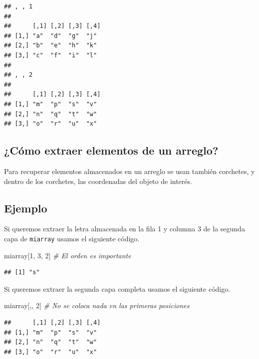 \documentclass[10pt,]{krantz}
\makeatletter
\newenvironment{Shaded}{\begin{snugshade}}{\end{snugshade}}
\newcommand{\DecValTok}[1]{\textcolor[rgb]{0.00,0.00,0.81}{{#1}}}
\newcommand{\CommentTok}[1]{\textcolor[rgb]{0.56,0.35,0.01}{\textit{{#1}}}}
\newcommand{\NormalTok}[1]{{#1}}
\newenvironment{kframe}{%
\medskip{}
\setlength{\fboxsep}{.8em}
 \def\at@end@of@kframe{}%
 \ifinner\ifhmode%
  \def\at@end@of@kframe{\end{minipage}}%
  \begin{minipage}{\columnwidth}%
 \fi\fi%
 \def\FrameCommand##1{\hskip\@totalleftmargin \hskip-\fboxsep
 \colorbox{shadecolor}{##1}\hskip-\fboxsep
     \hskip-\linewidth \hskip-\@totalleftmargin \hskip\columnwidth}%
 \MakeFramed {\advance\hsize-\width
   \@totalleftmargin\z@ \linewidth\hsize
   \@setminipage}}%
 {\par\unskip\endMakeFramed%
 \at@end@of@kframe}
\renewenvironment{Shaded}{\begin{kframe}}{\end{kframe}}
\makeatother
\begin{document}
\begin{verbatim}
## , , 1
## 
##      [,1] [,2] [,3] [,4]
## [1,] "a"  "d"  "g"  "j" 
## [2,] "b"  "e"  "h"  "k" 
## [3,] "c"  "f"  "i"  "l" 
## 
## , , 2
## 
##      [,1] [,2] [,3] [,4]
## [1,] "m"  "p"  "s"  "v" 
## [2,] "n"  "q"  "t"  "w" 
## [3,] "o"  "r"  "u"  "x"
\end{verbatim}

\subsection{¿Cómo extraer elementos de un
arreglo?}\label{como-extraer-elementos-de-un-arreglo}

Para recuperar elementos almacenados en un arreglo se usan también
corchetes, y dentro de los corchetes, las coordenadas del objeto de
interés.

\subsection*{Ejemplo}\label{ejemplo-2}


Si queremos extraer la letra almacenada en la fila 1 y columna 3 de la
segunda capa de \texttt{miarray} usamos el siguiente código.

\begin{Shaded}
\begin{Highlighting}[]
\NormalTok{miarray[}\DecValTok{1}\NormalTok{, }\DecValTok{3}\NormalTok{, }\DecValTok{2}\NormalTok{]  }\CommentTok{# El orden es importante}
\end{Highlighting}
\end{Shaded}

\begin{verbatim}
## [1] "s"
\end{verbatim}

Si queremos extraer la segunda capa completa usamos el siguiente código.

\begin{Shaded}
\begin{Highlighting}[]
\NormalTok{miarray[,, }\DecValTok{2}\NormalTok{]  }\CommentTok{# No se coloca nada en las primeras posiciones}
\end{Highlighting}
\end{Shaded}

\begin{verbatim}
##      [,1] [,2] [,3] [,4]
## [1,] "m"  "p"  "s"  "v" 
## [2,] "n"  "q"  "t"  "w" 
## [3,] "o"  "r"  "u"  "x"
\end{verbatim}
\end{document}
